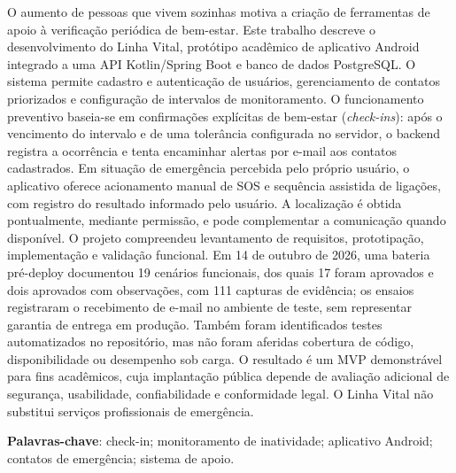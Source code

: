 \begin{resumo}

O aumento de pessoas que vivem sozinhas motiva a criação de ferramentas de apoio à verificação periódica de bem-estar. Este trabalho descreve o desenvolvimento do Linha Vital, protótipo acadêmico de aplicativo Android integrado a uma API Kotlin/Spring Boot e banco de dados PostgreSQL. O sistema permite cadastro e autenticação de usuários, gerenciamento de contatos priorizados e configuração de intervalos de monitoramento. O funcionamento preventivo baseia-se em confirmações explícitas de bem-estar (\textit{check-ins}): após o vencimento do intervalo e de uma tolerância configurada no servidor, o backend registra a ocorrência e tenta encaminhar alertas por e-mail aos contatos cadastrados. Em situação de emergência percebida pelo próprio usuário, o aplicativo oferece acionamento manual de SOS e sequência assistida de ligações, com registro do resultado informado pelo usuário. A localização é obtida pontualmente, mediante permissão, e pode complementar a comunicação quando disponível. O projeto compreendeu levantamento de requisitos, prototipação, implementação e validação funcional. Em 14 de outubro de 2026, uma bateria pré-deploy documentou 19 cenários funcionais, dos quais 17 foram aprovados e dois aprovados com observações, com 111 capturas de evidência; os ensaios registraram o recebimento de e-mail no ambiente de teste, sem representar garantia de entrega em produção. Também foram identificados testes automatizados no repositório, mas não foram aferidas cobertura de código, disponibilidade ou desempenho sob carga. O resultado é um MVP demonstrável para fins acadêmicos, cuja implantação pública depende de avaliação adicional de segurança, usabilidade, confiabilidade e conformidade legal. O Linha Vital não substitui serviços profissionais de emergência.

\vspace{\onelineskip}
\noindent
\textbf{Palavras-chave}: check-in; monitoramento de inatividade; aplicativo Android; contatos de emergência; sistema de apoio.
\end{resumo}
